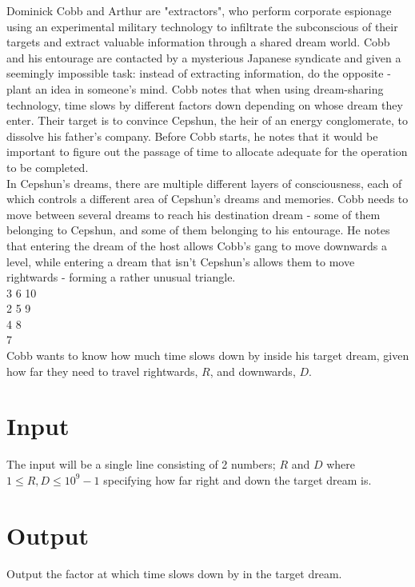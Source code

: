 
\noindent Dominick Cobb and Arthur are "extractors", who perform corporate espionage using an experimental military technology to infiltrate the subconscious of their targets and extract valuable information through a shared dream world. Cobb and his entourage are contacted by a mysterious Japanese syndicate and given a seemingly impossible task: instead of extracting information, do the opposite - plant an idea in someone's mind. Cobb notes that when using dream-sharing technology, time slows by different factors down depending on whose dream they enter. Their target is to convince Cepshun, the heir of an energy conglomerate, to dissolve his father's company. Before Cobb starts, he notes that it would be important to figure out the passage of time to allocate adequate for the operation to be completed.\\

\noindent In Cepshun's dreams, there are multiple different layers of consciousness, each of which controls a different area of Cepshun's dreams and memories. Cobb needs to move between several dreams to reach his destination dream - some of them belonging to Cepshun, and some of them belonging to his entourage. He notes that entering the dream of the host allows Cobb's gang to move downwards a level, while entering a dream that isn't Cepshun's allows them to move rightwards - forming a rather unusual triangle. \\

 3 6 10\\
 2 5 9\\
 4 8\\
 7\\

\noindent Cobb wants to know how much time slows down by inside his target dream, given how far they need to travel rightwards, $R$, and downwards, $D$. \\

\section*{Input}
The input will be a single line consisting of 2 numbers; $R$ and $D$ where $1 \leq R, D \leq 10^{9} - 1$ specifying how far right and down the target dream is.

\section*{Output}
Output the factor at which time slows down by in the target dream.
